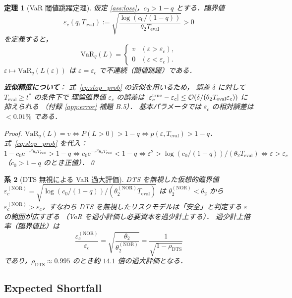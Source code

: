 \documentclass[12pt,a4paper]{article}
\theoremstyle{plain}
\newtheorem{theorem}{定理}[section]
\newtheorem{corollary}[theorem]{系}
\theoremstyle{definition}
\theoremstyle{remark}
\newcommand{\calO}{\mathcal{O}}
\newcommand{\eps}{\varepsilon}
\newcommand{\e}{\mathrm{e}}
\newcommand{\VaR}{\mathrm{VaR}}
\newcommand{\rhoDTS}{\rho_{\mathrm{DTS}}}
\newcommand{\Teval}{T_{\mathrm{eval}}}
\begin{document}
\begin{theorem}[VaR 閾値跳躍定理]\label{thm:VaR}
  仮定 \ref{ass:loss}，$c_0>1-q$ とする．臨界値
  \begin{equation}\label{eq:eps_c}
    \eps_c(q,\Teval)
    := \sqrt{\frac{\log(c_0/(1-q))}{\theta_2\Teval}} > 0
  \end{equation}
  を定義すると，
  \begin{equation}\label{eq:VaR_jump}
    \VaR_q(L) = \begin{cases}
      v & (\eps>\eps_c), \\
      0 & (\eps<\eps_c).
    \end{cases}
  \end{equation}
  $\eps\mapsto\VaR_q(L(\eps))$ は $\eps=\eps_c$ で不連続（閾値跳躍）である．

  \textbf{近似精度について}：
  式~\eqref{eq:stop_prob} の近似を用いるため，
  誤差 $\delta$ に対して $\Teval\ge t^*$ の条件下で
  理論臨界値 $\eps_c$ の誤差は
  $|\eps_c^{\rm true}-\eps_c|\le \calO(\delta/(\theta_2\Teval\eps_c))$ に抑えられる
  （付録 \ref{app:error} 補題 B.5）．
  基本パラメータでは $\eps_c$ の相対誤差は $<0.01\%$ である．

  \begin{proof}
    $\VaR_q(L)=v \iff P(L>0)>1-q \iff p(\eps,\Teval)>1-q$．
    式~\eqref{eq:stop_prob} を代入：
    $1-c_0\e^{-\eps^2\theta_2\Teval}>1-q
    \iff c_0\e^{-\eps^2\theta_2\Teval}<1-q
    \iff \eps^2>\log(c_0/(1-q))/(\theta_2\Teval)
    \iff \eps>\eps_c$（$c_0>1-q$ のとき正値）．\qed
  \end{proof}
\end{theorem}

\begin{corollary}[DTS 無視による VaR 過大評価]\label{cor:VaR_DTS}
  DTS を無視した仮想的臨界値
  $\eps_c^{(\mathrm{NOR})} = \sqrt{\log(c_0/(1-q))/(\theta_2^{(\mathrm{NOR})}\Teval)}$
  は $\theta_2^{(\mathrm{NOR})}<\theta_2$ から
  $\eps_c^{(\mathrm{NOR})}>\eps_c$，すなわち
  DTS を無視したリスクモデルは「安全」と判定する $\eps$ の範囲が広すぎる
  （VaR を過小評価し必要資本を過少計上する）．
  過少計上倍率（臨界値比）は
  \begin{equation}
    \frac{\eps_c^{(\mathrm{NOR})}}{\eps_c}
    = \sqrt{\frac{\theta_2}{\theta_2^{(\mathrm{NOR})}}}
    = \frac{1}{\sqrt{1-\rhoDTS}}
  \end{equation}
  であり，$\rhoDTS\approx0.995$ のとき約 $14.1$ 倍の過大評価となる．
\end{corollary}

\subsection{Expected Shortfall}
\end{document}
